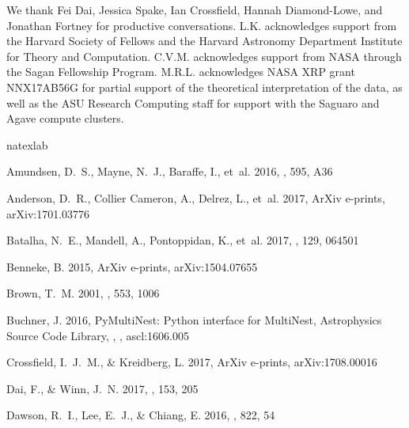 \documentclass[twocolumn, trackchanges]{aastex61}
\begin{document}
\acknowledgments
We thank Fei Dai, Jessica Spake, Ian Crossfield, Hannah Diamond-Lowe, and Jonathan Fortney for productive conversations. L.K. acknowledges support from the Harvard Society of Fellows and the Harvard Astronomy Department Institute for Theory and Computation. C.V.M. acknowledges support from NASA through the Sagan Fellowship Program. M.R.L. acknowledges NASA XRP grant NNX17AB56G for partial support of the theoretical interpretation of the data, as well as the ASU Research Computing staff for support with the Saguaro and Agave compute clusters.


\begin{thebibliography}{}
\expandafter\ifx\csname natexlab\endcsname\relax\def\natexlab#1{#1}\fi
\providecommand{\url}[1]{\href{#1}{#1}}

{Amundsen}, D.~S., {Mayne}, N.~J., {Baraffe}, I., {et~al.} 2016, \aap, 595, A36

{Anderson}, D.~R., {Collier Cameron}, A., {Delrez}, L., {et~al.} 2017, ArXiv
  e-prints, arXiv:1701.03776

{Batalha}, N.~E., {Mandell}, A., {Pontoppidan}, K., {et~al.} 2017, \pasp, 129,
  064501

{Benneke}, B. 2015, ArXiv e-prints, arXiv:1504.07655

{Brown}, T.~M. 2001, \apj, 553, 1006

{Buchner}, J. 2016, {PyMultiNest: Python interface for MultiNest}, Astrophysics
  Source Code Library, , , ascl:1606.005

{Crossfield}, I.~J.~M., \& {Kreidberg}, L. 2017, ArXiv e-prints,
  arXiv:1708.00016

{Dai}, F., \& {Winn}, J.~N. 2017, \aj, 153, 205

{Dawson}, R.~I., {Lee}, E.~J., \& {Chiang}, E. 2016, \apj, 822, 54


\end{thebibliography}
\end{document}

